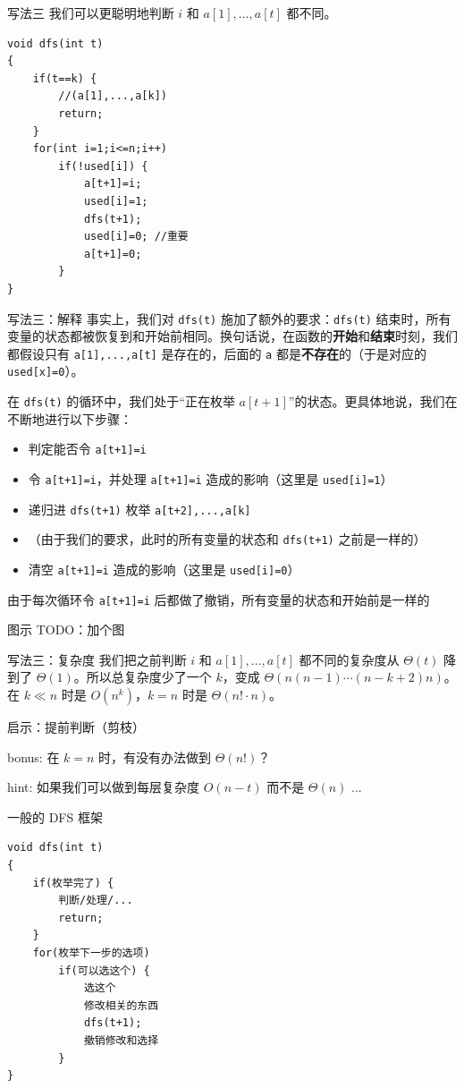 \documentclass[11pt,aspectratio=169]{beamer}
\begin{document}
\begin{frame}[fragile]{写法三}
    我们可以更聪明地判断 $i$ 和 $a[1],...,a[t]$ 都不同。
\begin{lstlisting}
void dfs(int t)
{
    if(t==k) {
        //(a[1],...,a[k])
        return;
    }
    for(int i=1;i<=n;i++)
        if(!used[i]) {
            a[t+1]=i;
            used[i]=1;
            dfs(t+1);
            used[i]=0; //重要
            a[t+1]=0;
        }
}
\end{lstlisting}
\end{frame}
\begin{frame}{写法三：解释}
    事实上，我们对 \texttt{dfs(t)} 施加了额外的要求：\texttt{dfs(t)} 结束时，所有变量的状态都被恢复到和开始前相同。换句话说，在函数的\textbf{开始}和\textbf{结束}时刻，我们都假设只有 \texttt{a[1],...,a[t]} 是存在的，后面的 \texttt{a} 都是\textbf{不存在}的（于是对应的 \texttt{used[x]=0}）。

    在 \texttt{dfs(t)} 的循环中，我们处于“正在枚举 $a[t+1]$”的状态。更具体地说，我们在不断地进行以下步骤：
    \begin{itemize}
        \item 判定能否令 \texttt{a[t+1]=i}
        \item 令 \texttt{a[t+1]=i}，并处理 \texttt{a[t+1]=i} 造成的影响（这里是 \texttt{used[i]=1}）
        \item 递归进 \texttt{dfs(t+1)} 枚举 \texttt{a[t+2],...,a[k]}
        \item （由于我们的要求，此时的所有变量的状态和 \texttt{dfs(t+1)} 之前是一样的）
        \item 清空 \texttt{a[t+1]=i} 造成的影响（这里是 \texttt{used[i]=0}）
    \end{itemize}
    由于每次循环令 \texttt{a[t+1]=i} 后都做了撤销，所有变量的状态和开始前是一样的
\end{frame}

\begin{frame}{图示}
TODO：加个图
\end{frame}
    
    
\begin{frame}{写法三：复杂度}
    我们把之前判断 $i$ 和 $a[1],\ldots,a[t]$ 都不同的复杂度从 $\Theta(t)$ 降到了 $\Theta(1)$。所以总复杂度少了一个 $k$，变成 $\Theta(n(n-1)\cdots(n-k+2)n)$。在 $k\ll n$ 时是 $O(n^k)$，$k=n$ 时是 $\Theta(n!\cdot n)$。

    启示：提前判断（剪枝）

    bonus: 在 $k=n$ 时，有没有办法做到 $\Theta(n!)$？

    hint: 如果我们可以做到每层复杂度 $O(n-t)$ 而不是 $\Theta(n)$ ...
\end{frame}
\begin{frame}[fragile]{一般的 DFS 框架}
\begin{lstlisting}
void dfs(int t)
{
    if(枚举完了) {
        判断/处理/...
        return;
    }
    for(枚举下一步的选项)
        if(可以选这个) {
            选这个
            修改相关的东西
            dfs(t+1);
            撤销修改和选择
        }
}
\end{lstlisting}
\end{frame}
\end{document}
